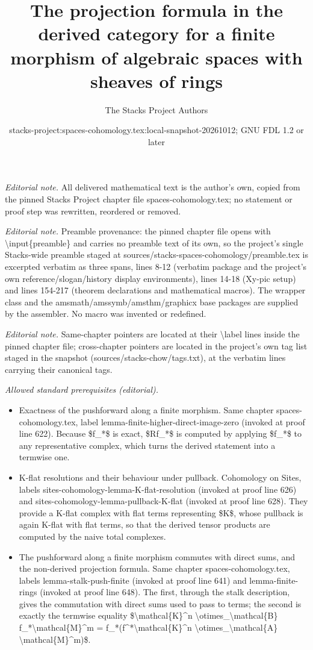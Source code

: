 \documentclass[10pt,a4paper]{amsart}
\title{The projection formula in the derived category for a finite morphism of algebraic spaces with sheaves of rings}
\author{The Stacks Project Authors}
\date{stacks-project:spaces-cohomology.tex:local-snapshot-20261012; GNU FDL 1.2 or later}
\theoremstyle{plain}
\theoremstyle{definition}
\theoremstyle{remark}
\numberwithin{equation}{subsection}
\begin{document}
\maketitle
\noindent\textit{Editorial note.} All delivered mathematical text is the author's own, copied from the pinned Stacks Project chapter file spaces-cohomology.tex; no statement or proof step was rewritten, reordered or removed.\par\medskip
\noindent\textit{Editorial note.} Preamble provenance: the pinned chapter file opens with \textbackslash{}input\{preamble\} and carries no preamble text of its own, so the project's single Stacks-wide preamble staged at sources/stacks-spaces-cohomology/preamble.tex is excerpted verbatim as three spans, lines 8-12 (verbatim package and the project's own reference/slogan/history display environments), lines 14-18 (Xy-pic setup) and lines 154-217 (theorem declarations and mathematical macros). The wrapper class and the amsmath/amssymb/amsthm/graphicx base packages are supplied by the assembler. No macro was invented or redefined.\par\medskip
\noindent\textit{Editorial note.} Same-chapter pointers are located at their \textbackslash{}label lines inside the pinned chapter file; cross-chapter pointers are located in the project's own tag list staged in the snapshot (sources/stacks-chow/tags.txt), at the verbatim lines carrying their canonical tags.\par\medskip
\noindent\textit{Allowed standard prerequisites (editorial).}\begin{itemize}
\item Exactness of the pushforward along a finite morphism. Same chapter spaces-cohomology.tex, label lemma-finite-higher-direct-image-zero (invoked at proof line 622). Because \$f\_*\$ is exact, \$Rf\_*\$ is computed by applying \$f\_*\$ to any representative complex, which turns the derived statement into a termwise one.
\item K-flat resolutions and their behaviour under pullback. Cohomology on Sites, labels sites-cohomology-lemma-K-flat-resolution (invoked at proof line 626) and sites-cohomology-lemma-pullback-K-flat (invoked at proof line 628). They provide a K-flat complex with flat terms representing \$K\$, whose pullback is again K-flat with flat terms, so that the derived tensor products are computed by the naive total complexes.
\item The pushforward along a finite morphism commutes with direct sums, and the non-derived projection formula. Same chapter spaces-cohomology.tex, labels lemma-stalk-push-finite (invoked at proof line 641) and lemma-finite-rings (invoked at proof line 648). The first, through the stalk description, gives the commutation with direct sums used to pass to terms; the second is exactly the termwise equality \$\textbackslash{}mathcal\{K\}\textasciicircum{}n \textbackslash{}otimes\_\textbackslash{}mathcal\{B\} f\_*\textbackslash{}mathcal\{M\}\textasciicircum{}m = f\_*(f\textasciicircum{}*\textbackslash{}mathcal\{K\}\textasciicircum{}n \textbackslash{}otimes\_\textbackslash{}mathcal\{A\} \textbackslash{}mathcal\{M\}\textasciicircum{}m)\$.
\end{itemize}\medskip
\end{document}
